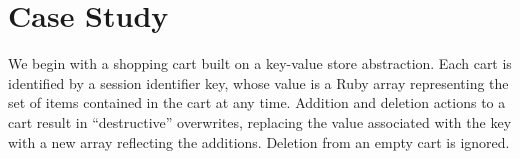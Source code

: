 \section{Case Study}
\label{sec:case}

We begin with a shopping
cart built on a key-value store abstraction.  Each cart is identified by a
session identifier key, whose value is a Ruby array
representing the set of items contained in the cart at any time.  Addition
and deletion actions to a cart result in ``destructive'' overwrites,
replacing the value associated with the key with a new array reflecting
the additions.  Deletion from an empty cart is ignored.

